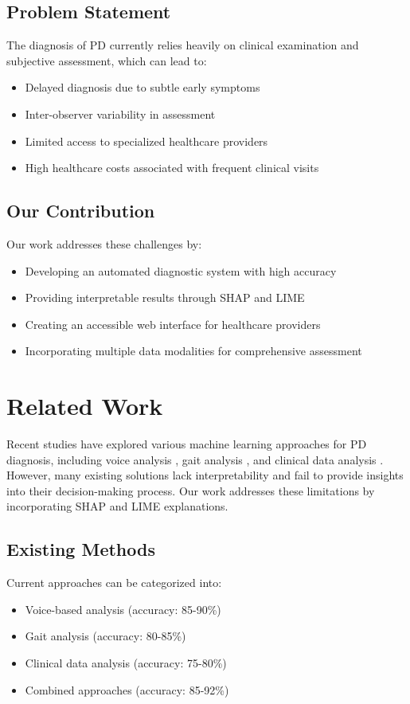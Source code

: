 \documentclass[conference]{IEEEtran}
\begin{document}
\subsection{Problem Statement}
The diagnosis of PD currently relies heavily on clinical examination and subjective assessment, which can lead to:
\begin{itemize}
    \item Delayed diagnosis due to subtle early symptoms
    \item Inter-observer variability in assessment
    \item Limited access to specialized healthcare providers
    \item High healthcare costs associated with frequent clinical visits
\end{itemize}

\subsection{Our Contribution}
Our work addresses these challenges by:
\begin{itemize}
    \item Developing an automated diagnostic system with high accuracy
    \item Providing interpretable results through SHAP and LIME
    \item Creating an accessible web interface for healthcare providers
    \item Incorporating multiple data modalities for comprehensive assessment
\end{itemize}

\section{Related Work}
Recent studies have explored various machine learning approaches for PD diagnosis, including voice analysis \cite{voice_analysis}, gait analysis \cite{gait_analysis}, and clinical data analysis \cite{clinical_data}. However, many existing solutions lack interpretability and fail to provide insights into their decision-making process. Our work addresses these limitations by incorporating SHAP and LIME explanations.

\subsection{Existing Methods}
Current approaches can be categorized into:
\begin{itemize}
    \item Voice-based analysis (accuracy: 85-90\%)
    \item Gait analysis (accuracy: 80-85\%)
    \item Clinical data analysis (accuracy: 75-80\%)
    \item Combined approaches (accuracy: 85-92\%)
\end{itemize}
\end{document}
